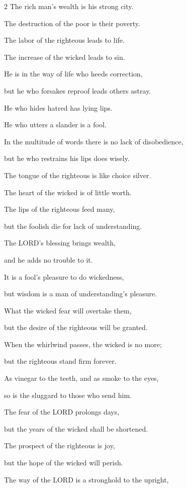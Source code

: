 \begin{multicols}{2}
\myverse{}The rich man’s wealth is his strong city.

The destruction of the poor is their poverty.


\myverse{}The labor of the righteous leads to life.

The increase of the wicked leads to sin.


\myverse{}He is in the way of life who heeds correction,

but he who forsakes reproof leads others astray.


\myverse{}He who hides hatred has lying lips.

He who utters a slander is a fool.


\myverse{}In the multitude of words there is no lack of disobedience,

but he who restrains his lips does wisely.


\myverse{}The tongue of the righteous is like choice silver.

The heart of the wicked is of little worth.


\myverse{}The lips of the righteous feed many,

but the foolish die for lack of understanding.


\myverse{}The LORD’s blessing brings wealth,

and he adds no trouble to it.


\myverse{}It is a fool’s pleasure to do wickedness,

but wisdom is a man of understanding’s pleasure.


\myverse{}What the wicked fear will overtake them,

but the desire of the righteous will be granted.


\myverse{}When the whirlwind passes, the wicked is no more;

but the righteous stand firm forever.


\myverse{}As vinegar to the teeth, and as smoke to the eyes,

so is the sluggard to those who send him.


\myverse{}The fear of the LORD prolongs days,

but the years of the wicked shall be shortened.


\myverse{}The prospect of the righteous is joy,

but the hope of the wicked will perish.


\myverse{}The way of the LORD is a stronghold to the upright,


\end{multicols}
